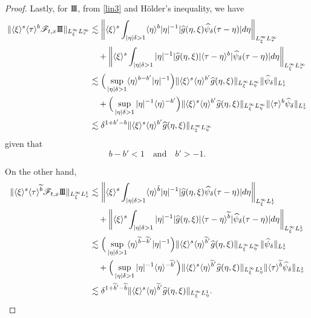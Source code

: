 \documentclass[a4paper, 11pt]{amsart}
\newcommand{\jap}[1]{\langle #1 \rangle}
\theoremstyle{plain}
\theoremstyle{definition}
\theoremstyle{remark}
\newcommand{\III}{\text{I \hspace{-2.9mm} I \hspace{-2.9mm} I}}
\newcommand{\5}{\text{V}}
\newcommand{\noi}{\noindent}
\newcommand{\ft}{\widehat}
\newcommand{\les}{\lesssim}
\newcommand{\dl}{\delta}
\newcommand{\F}{\mathcal{F}}
\newcommand{\wt}{\widetilde}
\numberwithin{equation}{section}
\theoremstyle{mytheoremstyle} \newtheorem{nota}[thm]{Remark}
\theoremstyle{mytheoremstyle} \newtheorem{exemplo}[thm]{Example}
\begin{document}
\begin{proof}
\noi
Lastly, for $\III$, from \eqref{lin3} and H\"older's inequality, we have
\begin{equation}
\begin{aligned}
\| \jap{\xi}^s \jap{\tau}^b \F_{t,x} \III \|_{L^\infty_\xi L^\infty_\tau} & \les \bigg\| \jap{\xi}^s \int_{|\eta|\dl >1} \jap{\eta}^b |\eta|^{-1} |\ft{g}(\eta, \xi) \ft{\psi}_\dl(\tau-\eta) | d\eta \bigg\|_{L^\infty_\xi L^\infty_\tau} \\
& \quad + \bigg\| \jap{\xi}^s \int_{|\eta|\dl >1}  |\eta|^{-1} |\ft{g}(\eta, \xi)| \jap{\tau - \eta}^b | \ft{\psi}_\dl(\tau-\eta) | d\eta \bigg\|_{L^\infty_\xi L^\infty_\tau} \\
& \les \Big( \sup_{|\eta|\dl>1} \jap{\eta}^{b-b'} |\eta|^{-1} \Big) \| \jap{\xi}^s \jap{\eta}^{b'} \ft{g}(\eta, \xi) \|_{L^\infty_\xi L^\infty_\eta} \| \ft{\psi}_\dl \|_{L^1_\tau} \\
& \quad + \Big( \sup_{|\eta|\dl>1} |\eta|^{-1} \jap{\eta }^{-b'} \Big)  \| \jap{\xi}^s \jap{\eta}^{b'} \ft{g}(\eta, \xi) \|_{L^\infty_\xi L^\infty_\eta} \| \jap{\tau}^{b} \ft{\psi}_\dl \|_{L^1_\tau } \\
& \les \dl^{1+b'-b} \| \jap{\xi}^s \jap{\eta}^{b'} \ft{g}(\eta, \xi) \|_{L^\infty_\xi L^\infty_\eta}
\end{aligned}
\label{lin6a}
\end{equation}
given that
\begin{equation}
b-b' < 1 \quad \text{and} \quad b'>-1.
\label{lin6b}
\end{equation}

\noi
On the other hand,
\begin{equation}
\begin{aligned}
\| \jap{\xi}^s \jap{\tau}^{\wt{b}} \F_{t,x} \III \|_{L^\infty_\xi L^1_\tau} & \les \bigg\| \jap{\xi}^s \int_{|\eta|\dl >1} \jap{\eta}^{\tilde{b}} |\eta|^{-1} |\ft{g}(\eta, \xi) \ft{\psi}_\dl(\tau-\eta) | d\eta \bigg\|_{L^\infty_\xi L^1_\tau} \\
& \quad + \bigg\| \jap{\xi}^s \int_{|\eta|\dl >1}  |\eta|^{-1} |\ft{g}(\eta, \xi)| \jap{\tau - \eta}^{\wt{b}} | \ft{\psi}_\dl(\tau-\eta) | d\eta \bigg\|_{L^\infty_\xi L^1_\tau} \\
& \les \Big( \sup_{|\eta|\dl>1} \jap{\eta}^{\wt{b}-\wt{b}'} |\eta|^{-1} \Big) \| \jap{\xi}^s \jap{\eta}^{\wt{b}'} \ft{g}(\eta, \xi) \|_{L^\infty_\xi L^\infty_\eta} \| \ft{\psi}_\dl \|_{L^1_\tau} \\
& \quad + \Big( \sup_{|\eta|\dl>1} |\eta|^{-1} \jap{\eta }^{-\wt{b}'} \Big)  \| \jap{\xi}^s \jap{\eta}^{\wt{b}'} \ft{g}(\eta, \xi) \|_{L^\infty_\xi L^1_\eta} \| \jap{\tau}^{\wt{b}} \ft{\psi}_\dl \|_{L^1_\tau } \\
& \les \dl^{1+\wt{b}'-\wt{b}} \| \jap{\xi}^s \jap{\eta}^{\wt{b}'} \ft{g}(\eta, \xi) \|_{L^\infty_\xi L^1_\eta}.
\end{aligned}
\label{lin6c}
\end{equation}




\end{proof}
\end{document}
